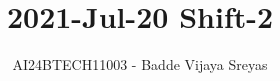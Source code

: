 \documentclass[journal]{IEEEtran}
\begin{document}

\vspace{3cm}

\title{2021-Jul-20 Shift-2}
\author{AI24BTECH11003 - Badde Vijaya Sreyas}
{\let\newpage\relax\maketitle}

\renewcommand{\thefigure}{\theenumi}
\renewcommand{\thetable}{\theenumi}
\setlength{\intextsep}{10pt} %


\renewcommand{\thetable}{\theenumi}
\end{document}
